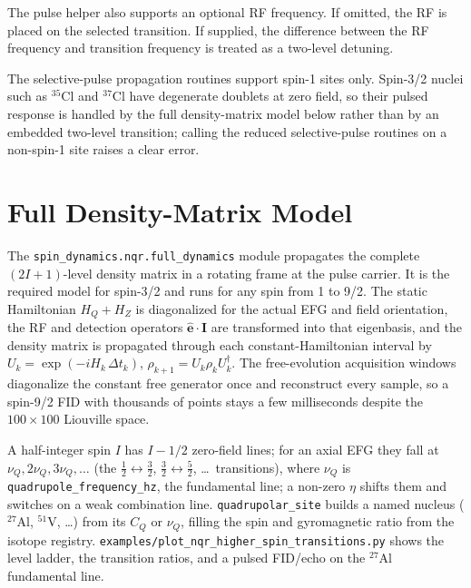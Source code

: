 \documentclass[11pt,oneside]{report}
\newcommand{\code}[1]{\texttt{#1}}
\begin{document}
The pulse helper also supports an optional RF frequency. If omitted, the RF is
placed on the selected transition. If supplied, the difference between the RF
frequency and transition frequency is treated as a two-level detuning.

The selective-pulse propagation routines support spin-1 sites only. Spin-3/2
nuclei such as \({}^{35}\mathrm{Cl}\) and \({}^{37}\mathrm{Cl}\) have degenerate
doublets at zero field, so their pulsed response is handled by the full
density-matrix model below rather than by an embedded two-level transition;
calling the reduced selective-pulse routines on a non-spin-1 site raises a clear
error.

\section{Full Density-Matrix Model}
\label{sec:nqr-full}

The \code{spin\_dynamics.nqr.full\_dynamics} module propagates the complete
\((2I+1)\)-level density matrix in a rotating frame at the pulse carrier. It is
the required model for spin-3/2 and runs for any spin from 1 to 9/2. The static
Hamiltonian \(H_Q+H_Z\) is diagonalized for the actual EFG and field
orientation, the RF and detection operators \(\hat{\mathbf{e}}\cdot\mathbf{I}\)
are transformed into that eigenbasis, and the density matrix is propagated
through each constant-Hamiltonian interval by
\(U_k=\exp(-iH_k\,\Delta t_k)\), \(\rho_{k+1}=U_k\rho_k U_k^{\dagger}\). The
free-evolution acquisition windows diagonalize the constant free generator once
and reconstruct every sample, so a spin-9/2 FID with thousands of points stays a
few milliseconds despite the \(100\times100\) Liouville space.

A half-integer spin \(I\) has \(I-1/2\) zero-field lines; for an axial EFG they
fall at \(\nu_Q, 2\nu_Q, 3\nu_Q, \ldots\) (the \(\tfrac12\!\leftrightarrow\!\tfrac32\),
\(\tfrac32\!\leftrightarrow\!\tfrac52\), \ldots\ transitions), where \(\nu_Q\) is
\code{quadrupole\_frequency\_hz}, the fundamental line; a non-zero \(\eta\) shifts
them and switches on a weak combination line. \code{quadrupolar\_site} builds a
named nucleus (\({}^{27}\mathrm{Al}\), \({}^{51}\mathrm{V}\), \ldots) from its
\(C_Q\) or \(\nu_Q\), filling the spin and gyromagnetic ratio from the isotope
registry. \code{examples/plot\_nqr\_higher\_spin\_transitions.py} shows the level
ladder, the transition ratios, and a pulsed FID/echo on the \({}^{27}\mathrm{Al}\)
fundamental line.
\end{document}
